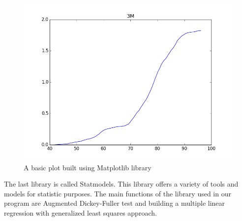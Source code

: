 \documentclass[
  twoside,
  11pt, a4paper,
  footinclude=true,
  headinclude=true,
  cleardoublepage=empty
]{scrreprt}
\begin{document}
    \begin{figure}[h]
        \includegraphics[scale=0.5]{img_examples/PythonPlotExample.png}
        \centering
        \caption{A basic plot built using Matplotlib library}
        \label{fig:PythonPlotExample}
    \end{figure}
    
    The last library is called Statmodels. This library offers a variety of tools and models for statistic purposes. The main functions of the library used in our program are Augmented Dickey-Fuller test and building a multiple linear regression with generalized least squares approach.\\
    
\end{document}
